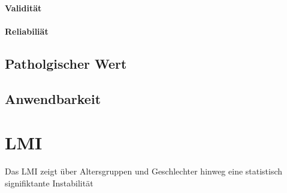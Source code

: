 \documentclass{report}
\begin{document}
\paragraph{Validität}
\paragraph{Reliabiliät}

\subsection{Patholgischer Wert}
\subsection{Anwendbarkeit}

\section{LMI}
Das LMI zeigt über Altersgruppen und Geschlechter hinweg eine statistisch signifiktante Instabilität \cite{Chaput2011}



\end{document}
